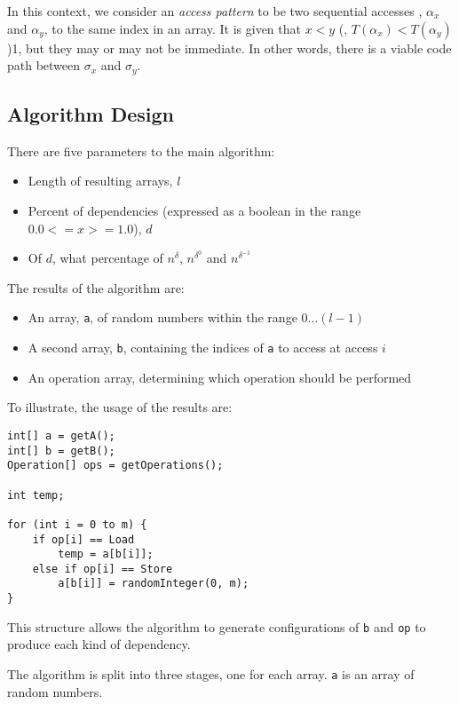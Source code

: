 	In this context, we consider an \textit{access pattern} to be two sequential accesses , $\alpha_x$ and $\alpha_y$, to the same index in an array. It is given that $x < y$ (\ie, $T(\alpha_x) < T(\alpha_y)$)1, but they may or may not be immediate. In other words, there is a viable code path between $\sigma_x$ and $\sigma_y$.
	
	\subsection{Algorithm Design} \label{sec:methodology/params/algo}
	There are five parameters to the main algorithm:
	
	\begin{itemize}
		\item Length of resulting arrays, $l$
		\item Percent of dependencies (expressed as a boolean in the range $0.0 <= x >= 1.0$), $d$
		\item Of $d$, what percentage of $n^{\delta}$, $n^{\delta^{0}}$ and $n^{\delta^{-1}}$
	\end{itemize}
	
	The results of the algorithm are:
	
	\begin{itemize}
		\item An array, \texttt{a}, of random numbers within the range $0...(l - 1)$
		\item A second array, \texttt{b}, containing the indices of \texttt{a} to access at access $i$
		\item An operation array, determining which operation should be performed
	\end{itemize}
	
	To illustrate, the usage of the results are:
	
	\begin{lstlisting}
int[] a = getA();
int[] b = getB();
Operation[] ops = getOperations();

int temp;

for (int i = 0 to m) {
    if op[i] == Load
        temp = a[b[i]];
    else if op[i] == Store
        a[b[i]] = randomInteger(0, m);
}\end{lstlisting}

	This structure allows the algorithm to generate configurations of \texttt{b} and \texttt{op} to produce each kind of dependency.
	
	The algorithm is split into three stages, one for each array. \texttt{a} is an array of random numbers.
	
